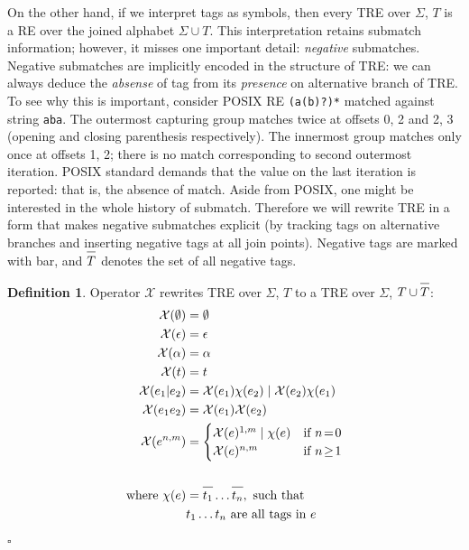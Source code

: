 \documentclass{article}
\newcommand{\Xeq}{\!=\!}
\newcommand{\XX}{\mathcal{X}}
\newcommand*{\Xbar}[1]{\overline{#1\vphantom{\bar{#1}}}}
\theoremstyle{definition}
\newtheorem{Xdef}{Definition}
\begin{document}
\begin{multicols}{2}
On the other hand, if we interpret tags as symbols, then every TRE over $\Sigma$, $T$ is a RE over the joined alphabet $\Sigma \cup T$.
This interpretation retains submatch information; however, it misses one important detail: \emph{negative} submatches.
Negative submatches are implicitly encoded in the structure of TRE:
we can always deduce the \emph{absense} of tag from its \emph{presence} on alternative branch of TRE.
To see why this is important, consider POSIX RE \texttt{(a(b)?)*} matched against string \texttt{aba}.
The outermost capturing group matches twice at offsets 0, 2 and 2, 3 (opening and closing parenthesis respectively).
The innermost group matches only once at offsets 1, 2; there is no match corresponding to second outermost iteration.
POSIX standard demands that the value on the last iteration is reported: that is, the absence of match.
Aside from POSIX, one might be interested in the whole history of submatch.
Therefore we will rewrite TRE in a form that makes negative submatches explicit
(by tracking tags on alternative branches and inserting negative tags at all join points).
Negative tags are marked with bar, and $\Xbar{T}$ denotes the set of all negative tags.

    \begin{Xdef}\label{deftlang}
    Operator $\XX$ rewrites TRE over $\Sigma$, $T$ to a TRE over $\Sigma$, $T \cup \Xbar{T}$:
    \begin{align*}
        \XX(\emptyset) &= \emptyset \\
        \XX(\epsilon) &= \epsilon \\
        \XX(\alpha) &= \alpha \\
        \XX(t) &= t \\
        \XX(e_1 | e_2)
            &=      \XX(e_1) \chi(e_2) \mid \XX(e_2) \chi(e_1) \\
        \XX(e_1 e_2) &= \XX(e_1) \XX(e_2) \\
        \XX(e^{n,m}) &= \begin{cases}
                \XX(e)^{1,m} \mid \chi(e) &\text{if } n \Xeq 0 \\
                \XX(e)^{n,m} &\text{if } n \!\geq\! 1
            \end{cases} \\
        \\
        \text{where }
            \chi(e) &= \Xbar{t_1} \dots \Xbar{t_n}, \text{ such that} \\
                &t_1 \dots t_n \text{ are all tags in } e
    \end{align*}
    $\square$
    \end{Xdef}


\end{multicols}
\end{document}
